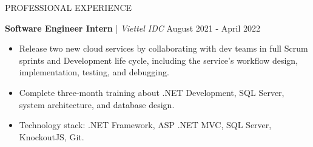 \begin{rSection}{PROFESSIONAL EXPERIENCE}
    \vspace{1em}

    \quad\textbf{Software Engineer Intern} | \textit{Viettel IDC} \hfill August 2021 - April 2022\\
    \begin{itemize}
        \itemsep 0pt {} \vspace{-1em}
        \item Release two new cloud services by collaborating with dev teams in full Scrum sprints and Development life cycle,
              including the service's workflow design, implementation, testing, and debugging.
        \item Complete three-month training about .NET Development, SQL Server, system architecture, and database design.
        \item Technology stack: .NET Framework, ASP .NET MVC, SQL Server, KnockoutJS, Git.

    \end{itemize}

\end{rSection}


